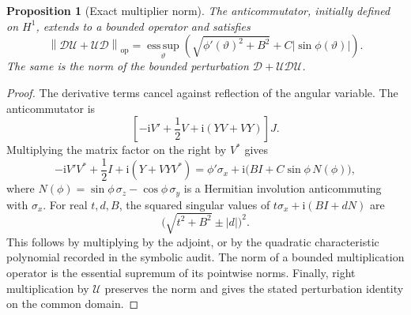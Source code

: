 \documentclass[11pt]{article}
\newtheorem{proposition}[theorem]{Proposition}
\theoremstyle{remark}
\newcommand{\op}{\mathrm{op}}
\newcommand{\norm}[1]{\left\lVert#1\right\rVert_{\op}}
\newcommand{\ii}{\mathrm{i}}
\newcommand{\esssup}{\operatorname*{ess\,sup}}
\begin{document}
\begin{proposition}[Exact multiplier norm]\label{prop:multiplier}
The anticommutator, initially defined on $H^1$, extends to a bounded operator and satisfies
\begin{equation}\label{eq:model-norm}
 \boxed{\norm{\mathcal D\mathcal U+\mathcal U\mathcal D}
 =\esssup_\vartheta\left(\sqrt{\phi'(\vartheta)^2+B^2}
 +C|\sin\phi(\vartheta)|\right).}
\end{equation}
The same is the norm of the bounded perturbation $\mathcal D+\mathcal U\mathcal D\mathcal U$.
\end{proposition}
\begin{proof}
The derivative terms cancel against reflection of the angular variable. The anticommutator is
\[
 \left[-\ii V'+\frac12V+\ii(YV+VY)\right]J.
\]
Multiplying the matrix factor on the right by $V^*$ gives
\[
 -\ii V'V^*+\frac12I+\ii(Y+VYV^*)
 =\phi'\sigma_x+\ii\bigl(BI+C\sin\phi\,N(\phi)\bigr),
\]
where $N(\phi)=\sin\phi\,\sigma_z-\cos\phi\,\sigma_y$ is a Hermitian involution anticommuting with $\sigma_x$. For real $t,d,B$, the squared singular values of
$t\sigma_x+\ii(BI+dN)$ are
\[
 \bigl(\sqrt{t^2+B^2}\pm |d|\bigr)^2.
\]
This follows by multiplying by the adjoint, or by the quadratic characteristic polynomial recorded in the symbolic audit. The norm of a bounded multiplication operator is the essential supremum of its pointwise norms. Finally, right multiplication by $\mathcal U$ preserves the norm and gives the stated perturbation identity on the common domain.
\end{proof}

\end{document}

